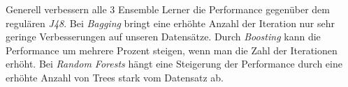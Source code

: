 Generell verbessern alle 3 Ensemble Lerner die Performance gegen\"uber dem regul\"aren \emph{J48}. Bei \emph{Bagging} bringt eine erh\"ohte Anzahl der Iteration nur sehr geringe Verbesserungen auf unseren Datens\"atze. Durch \emph{Boosting} kann die Performance um mehrere Prozent steigen, wenn man die Zahl der Iterationen erh\"oht. Bei \emph{Random Forests} h\"angt eine Steigerung der Performance durch eine erh\"ohte Anzahl von Trees stark vom Datensatz ab. 
